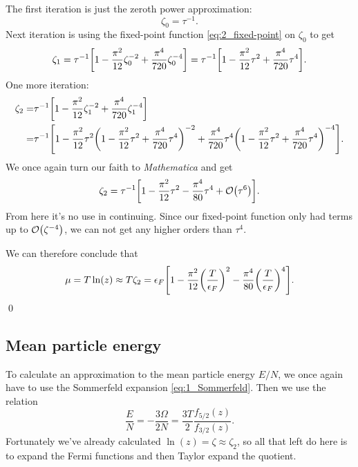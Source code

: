 \documentclass[11pt,letter, swedish, english
]{article}
\begin{document}
The first iteration is just the zeroth power approximation:
\begin{equation}
\zeta_0=\tau^{-1}.
\end{equation}
Next iteration is using the fixed-point function
\eqref{eq:2_fixed-point} on $\zeta_0$ to get
\begin{equation}
\zeta_1=\tau^{-1}\qty[1 - \frac{\pi^2}{12}\zeta_0^{-2}
 + \frac{\pi^4}{720}\zeta_0^{-4} ]
=\tau^{-1}\qty[1 - \frac{\pi^2}{12}\tau^{2}
 + \frac{\pi^4}{720}\tau^{4} ].
\end{equation}
One more iteration:
\begin{equation}
\begin{aligned}
\zeta_2=&\tau^{-1}\qty[1 - \frac{\pi^2}{12}\zeta_1^{-2}
 + \frac{\pi^4}{720}\zeta_1^{-4} ]\\
=& \tau^{-1}\qty[1 
 - \frac{\pi^2}{12}\tau^{2}
\qty(1 - \frac{\pi^2}{12}\tau^{2}
 + \frac{\pi^4}{720}\tau^{4})^{-2}
 + \frac{\pi^4}{720}\tau^{4} 
\qty(1 - \frac{\pi^2}{12}\tau^{2}
 + \frac{\pi^4}{720}\tau^{4})^{-4}
].
\end{aligned}
\end{equation}
We once again turn our faith to \emph{Mathematica} and get
\begin{equation}
\zeta_2=\tau^{-1}\qty[1 - \frac{\pi^2}{12}\tau^{2}
 - \frac{\pi^4}{80}\tau^{4} + \order{\tau^6}].
\end{equation}
From here it's no use in continuing. Since our fixed-point function
only had terms up to $\order{\zeta^{-4}}$, we can not get any higher
orders than $\tau^4$.

We can therefore conclude that
\begin{equation}\label{eq:2_mu}
\mu=T\ln(z)\approx T\zeta_2= \epsilon_F \qty[1
-\frac{\pi^2}{12}\qty(\frac{T}{\epsilon_F})^2
-\frac{\pi^4}{80}\qty(\frac{T}{\epsilon_F})^4].
\end{equation}
\qed

\subsection{Mean particle energy}
To calculate an approximation to the mean particle energy $E/N$, we
once again have to use the Sommerfeld expansion
\eqref{eq:1_Sommerfeld}. Then we use the relation
\begin{equation}
\frac{E}{N}=-\frac{3\Omega}{2N}=\frac{3T}{2}\frac{f_{5/2}(z)}{f_{3/2}(z)}.
\end{equation}
Fortunately we've already calculated $\ln(z)=\zeta\approx\zeta_2$, so all
that left do here is to expand the Fermi functions and then
Taylor expand the quotient.
\end{document}
